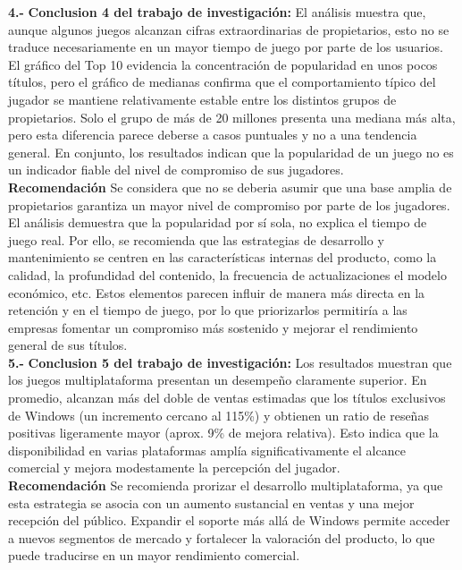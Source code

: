 \documentclass[oneside,11pt]{Latex/Classes/PhDthesisPSnPDF}
\begin{document}
\textbf{4.-} \textbf{Conclusion 4 del trabajo de investigación:} El
análisis muestra que, aunque algunos juegos alcanzan cifras
extraordinarias de propietarios, esto no se traduce necesariamente en un
mayor tiempo de juego por parte de los usuarios. El gráfico del Top 10
evidencia la concentración de popularidad en unos pocos títulos, pero el
gráfico de medianas confirma que el comportamiento típico del jugador se
mantiene relativamente estable entre los distintos grupos de
propietarios. Solo el grupo de más de 20 millones presenta una mediana
más alta, pero esta diferencia parece deberse a casos puntuales y no a
una tendencia general. En conjunto, los resultados indican que la
popularidad de un juego no es un indicador fiable del nivel de
compromiso de sus jugadores.\\

\textbf{Recomendación} Se considera que no se deberia asumir que una
base amplia de propietarios garantiza un mayor nivel de compromiso por
parte de los jugadores. El análisis demuestra que la popularidad por sí
sola, no explica el tiempo de juego real. Por ello, se recomienda que
las estrategias de desarrollo y mantenimiento se centren en las
características internas del producto, como la calidad, la profundidad
del contenido, la frecuencia de actualizaciones el modelo económico,
etc. Estos elementos parecen influir de manera más directa en la
retención y en el tiempo de juego, por lo que priorizarlos permitiría a
las empresas fomentar un compromiso más sostenido y mejorar el
rendimiento general de sus títulos.\\

\textbf{5.-} \textbf{Conclusion 5 del trabajo de investigación:} Los
resultados muestran que los juegos multiplataforma presentan un
desempeño claramente superior. En promedio, alcanzan más del doble de
ventas estimadas que los títulos exclusivos de Windows (un incremento
cercano al 115\%) y obtienen un ratio de reseñas positivas ligeramente
mayor (aprox. 9\% de mejora relativa). Esto indica que la disponibilidad
en varias plataformas amplía significativamente el alcance comercial y
mejora modestamente la percepción del jugador.\\

\textbf{Recomendación} Se recomienda prorizar el desarrollo
multiplataforma, ya que esta estrategia se asocia con un aumento
sustancial en ventas y una mejor recepción del público. Expandir el
soporte más allá de Windows permite acceder a nuevos segmentos de
mercado y fortalecer la valoración del producto, lo que puede traducirse
en un mayor rendimiento comercial.\\
\end{document}

